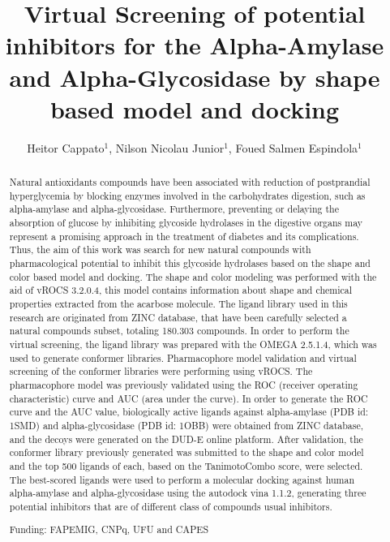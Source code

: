 \documentclass[twoside]{article}
\title{\vspace{-15mm}\fontsize{24pt}{10pt}\selectfont\textbf{Virtual Screening of potential inhibitors for the Alpha-Amylase and Alpha-Glycosidase by shape based model and docking}} %
\author{Heitor Cappato$^1$, Nilson Nicolau Junior$^1$, Foued Salmen Espindola$^1$}
\affil{1 UFU\\ }
\date{}
\begin{document}
\maketitle %

\thispagestyle{fancy} %


\begin{abstract}
Natural antioxidants compounds have been associated with reduction of postprandial hyperglycemia by blocking enzymes involved in the carbohydrates digestion, such as alpha-amylase and alpha-glycosidase. Furthermore, preventing or delaying the absorption of glucose by inhibiting glycoside hydrolases in the digestive organs may represent a promising approach in the treatment of diabetes and its complications. Thus, the aim of this work was search for new natural compounds with pharmacological potential to inhibit this glycoside hydrolases based on the shape and color based model and docking. The shape and color modeling was performed with the aid of vROCS 3.2.0.4, this model contains information about shape and chemical properties extracted from the acarbose molecule. The ligand library used in this research are originated from ZINC database, that have been carefully selected a natural compounds subset, totaling 180.303 compounds. In order to perform the virtual screening, the ligand library was prepared with the OMEGA 2.5.1.4, which was used to generate conformer libraries. Pharmacophore model validation and virtual screening of the conformer libraries were performing using vROCS. The pharmacophore model was previously validated using the ROC (receiver operating characteristic) curve and AUC (area under the curve). In order to generate the ROC curve and the AUC value, biologically active ligands against alpha-amylase (PDB id: 1SMD) and alpha-glycosidase (PDB id: 1OBB) were obtained from ZINC database, and the decoys were generated on the DUD-E online platform. After validation, the conformer library previously generated was submitted to the shape and color model and the top 500 ligands of each, based on the TanimotoCombo score, were selected. The best-scored ligands were used to perform a molecular docking against human alpha-amylase and alpha-glycosidase using the autodock vina 1.1.2, generating three potential inhibitors that are of different class of compounds usual inhibitors.

Funding: FAPEMIG, CNPq, UFU and CAPES
\end{abstract}
\end{document}
